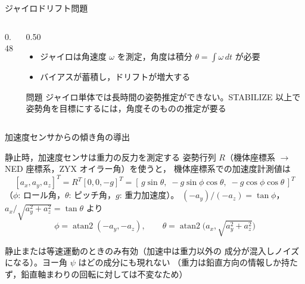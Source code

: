 
\begin{frame}{ジャイロドリフト問題}
  \begin{columns}[c]
    \begin{column}{0.48\textwidth}
      \centering
    \end{column}
    \begin{column}{0.50\textwidth}
      \begin{itemize}\footnotesize
        \item ジャイロは角速度 $\omega$ を測定，角度は積分 $\theta=\int\omega\,dt$ が必要
        \item バイアスが蓄積し，ドリフトが増大する
      \end{itemize}
      \vspace{0.5em}
      \begin{alertblock}{問題}\footnotesize
        ジャイロ単体では長時間の姿勢推定ができない。STABILIZE 以上で
        姿勢角を目標にするには，角度そのものの推定が要る
      \end{alertblock}
    \end{column}
  \end{columns}
\end{frame}

\begin{frame}{加速度センサからの傾き角の導出\later}
  \begin{block}{静止時，加速度センサは重力の反力を測定する}\footnotesize
    \setlength{\abovedisplayskip}{2pt}\setlength{\belowdisplayskip}{2pt}%
    姿勢行列 $R$（機体座標系 $\to$ NED 座標系，ZYX オイラー角）を使うと，
    機体座標系での加速度計測値は
    \[
      [a_x,a_y,a_z]^T = R^T[0,0,-g]^T
      = [\,g\sin\theta,\; -g\sin\phi\cos\theta,\; -g\cos\phi\cos\theta\,]^T
    \]
    （$\phi$: ロール角，$\theta$: ピッチ角，$g$: 重力加速度）。
    $(-a_y)/(-a_z)=\tan\phi$，$a_x/\sqrt{a_y^2+a_z^2}=\tan\theta$ より
    \[
      \phi = \operatorname{atan2}(-a_y,-a_z), \qquad
      \theta = \operatorname{atan2}\!\bigl(a_x,\sqrt{a_y^2+a_z^2}\bigr)
    \]
  \end{block}

  {\footnotesize {} 静止または等速運動のときのみ有効（加速中は重力以外の
  成分が混入しノイズになる）。ヨー角 $\psi$ はどの成分にも現れない
  （重力は鉛直方向の情報しか持たず，鉛直軸まわりの回転に対しては不変なため）}
\end{frame}

